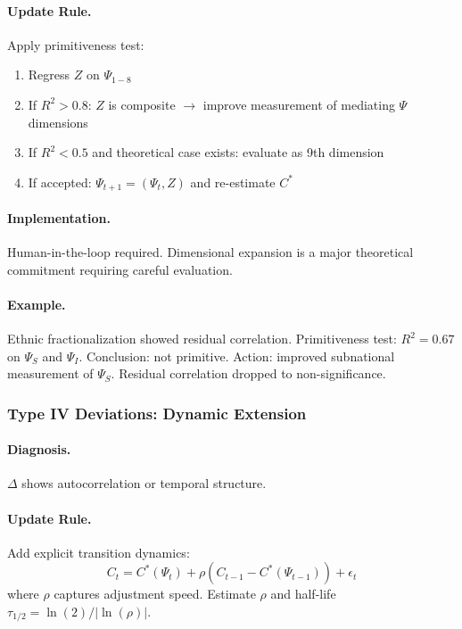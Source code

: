 \paragraph{Update Rule.}
Apply primitiveness test:
\begin{enumerate}
    \item Regress $Z$ on $\Psi_{1-8}$
    \item If $R^2 > 0.8$: $Z$ is composite $\rightarrow$ improve measurement of 
          mediating $\Psi$ dimensions
    \item If $R^2 < 0.5$ and theoretical case exists: evaluate as 9th dimension
    \item If accepted: $\Psi_{t+1} = (\Psi_t, Z)$ and re-estimate $C^*$
\end{enumerate}

\paragraph{Implementation.}
Human-in-the-loop required. Dimensional expansion is a major theoretical 
commitment requiring careful evaluation.

\paragraph{Example.}
Ethnic fractionalization showed residual correlation. Primitiveness test: 
$R^2 = 0.67$ on $\Psi_S$ and $\Psi_I$. Conclusion: not primitive. Action: 
improved subnational measurement of $\Psi_S$. Residual correlation dropped 
to non-significance.

\subsubsection{Type IV Deviations: Dynamic Extension}

\paragraph{Diagnosis.}
$\Delta$ shows autocorrelation or temporal structure.

\paragraph{Update Rule.}
Add explicit transition dynamics:
\begin{equation}
C_t = C^*(\Psi_t) + \rho (C_{t-1} - C^*(\Psi_{t-1})) + \epsilon_t
\end{equation}
where $\rho$ captures adjustment speed. Estimate $\rho$ and half-life 
$\tau_{1/2} = \ln(2) / |\ln(\rho)|$.

